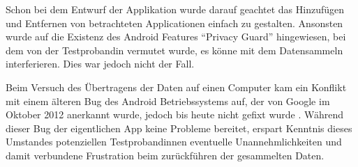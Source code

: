 Schon bei dem Entwurf der Applikation wurde darauf geachtet das Hinzufügen und Entfernen von betrachteten Applicationen einfach zu gestalten.
Ansonsten wurde auf die Existenz des Android Features "`Privacy Guard"' hingewiesen, bei dem von der Testprobandin vermutet wurde, es könne mit dem Datensammeln interferieren.
Dies war jedoch nicht der Fall.
\par
Beim Versuch des Übertragens der Daten auf einen Computer kam ein Konflikt mit einem älteren Bug des Android Betriebssystems auf, der von Google im Oktober 2012 anerkannt wurde, jedoch bis heute nicht gefixt wurde
\cite{androidbug}.
Während dieser Bug der eigentlichen App keine Probleme bereitet, erspart Kenntnis dieses Umstandes potenziellen Testprobandinnen eventuelle Unannehmlichkeiten und damit verbundene Frustration beim zurückführen der gesammelten Daten.


